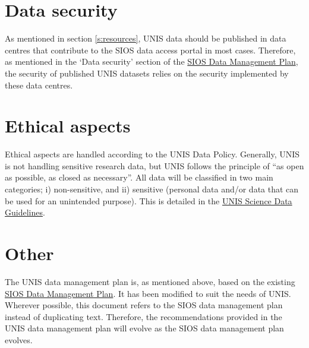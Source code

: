 \documentclass[a4paper,english, 11pt]{article}
\begin{document}
\section{Data security}
\label{s:security}

As mentioned in section \ref{s:resources}, UNIS data should be published in data centres that contribute to the SIOS data access portal in most cases. Therefore, as mentioned in the `Data security' section of the \href{https://sios-svalbard.org/sites/sios-svalbard.org/files/common/Documents/SIOS_Data_Management_Plan.pdf}{SIOS Data Management Plan}, the security of published UNIS datasets relies on the security implemented by these data centres.

\section{Ethical aspects}
\label{s:ethics}

Ethical aspects are handled according to the UNIS Data Policy. Generally, UNIS is not handling sensitive research data, but UNIS follows the principle of ``as open as possible, as closed as necessary''. All data will be classified in two main categories; i) non-sensitive, and ii) sensitive (personal data and/or data that can be used for an unintended purpose). This is detailed in the \href{https://www.unis.no/wp-content/uploads/2025/11/sciencedataguidelines.pdf}{UNIS Science Data Guidelines}.

\section{Other}
\label{s:other}

The UNIS data management plan is, as mentioned above, based on the existing \href{https://sios-svalbard.org/sites/sios-svalbard.org/files/common/Documents/SIOS_Data_Management_Plan.pdf }{SIOS Data Management Plan}. It has been modified to suit the needs of UNIS. Wherever possible, this document refers to the SIOS data management plan instead of duplicating text. Therefore, the recommendations provided in the UNIS data management plan will evolve as the SIOS data management plan evolves. 
\end{document}
